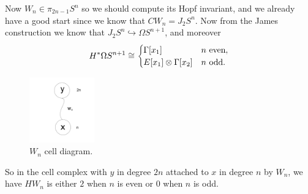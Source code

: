 \documentclass{article}
\newcommand{\Loops}{\Omega}
\newcommand{\into}{\hookrightarrow}
\begin{document}
Now $W_n \in \pi_{2n-1} S^n$ so we should compute its Hopf invariant, and we already have a good start since we know that $C W_n = J_2 S^n$.  Now from the James construction we know that $J_2 S^n \into \Loops S^{n+1}$, and moreover
\[
H^* \Loops S^{n+1} \cong \begin{cases} \Gamma[x_1] & \hbox{$n$ even}, \\ E[x_1] \otimes \Gamma[x_2] & \hbox{$n$ odd}.\end{cases}
\]
\begin{figure}
\centering\includegraphics[width=0.25\textwidth]{figures/24.pdf}
\caption{\small $W_n$ cell diagram.}
\end{figure}
So in the cell complex with $y$ in degree $2n$ attached to $x$ in degree $n$ by $W_n$, we have $HW_n$ is either $2$ when $n$ is even or $0$ when $n$ is odd.
\end{document}

